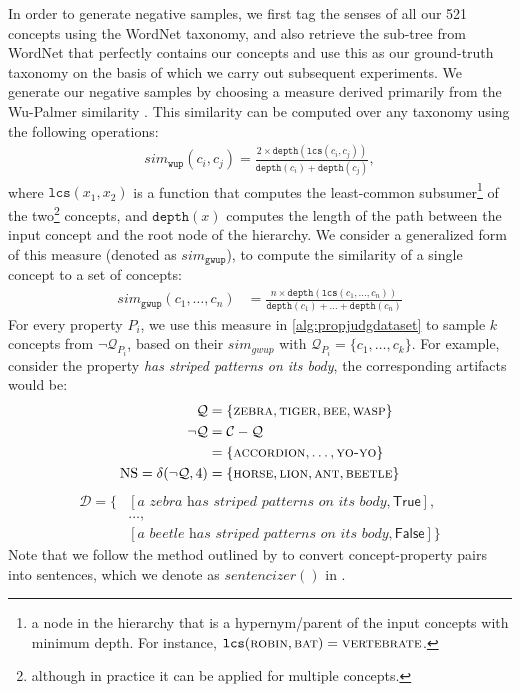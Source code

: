 \documentclass[11pt]{article}    %
\newcommand{\todo}[1]{\textcolor{MidnightBlue}{$_{todo}$[#1]}}
\newcommand{\concepts}{\mathcal{C}}
\newcommand{\true}{\mathsf{True}}
\newcommand{\false}{\mathsf{False}}
\newcommand{\positives}{\mathcal{Q}}
\newcommand{\leftovers}{\neg\positives}
\newcommand{\negsamp}{\delta}
\newcommand{\depth}{\texttt{depth}}
\newcommand{\lcs}{\texttt{lcs}}
\begin{document}
In order to generate negative samples, we first tag the senses of all our 521 concepts using the WordNet \citep{miller1995wordnet} taxonomy, and also retrieve the sub-tree from WordNet that perfectly contains our concepts and use this as our ground-truth taxonomy on the basis of which we carry out subsequent experiments.
We generate our negative samples by choosing a measure derived primarily from the Wu-Palmer similarity \citep{wu-palmer-1994-verb}.
This similarity can be computed over any taxonomy using the following operations:
\begin{align}
    sim_{\texttt{wup}}(c_i, c_j) = \frac{2 \times \depth(\lcs(c_i, c_j))}{\depth(c_i) + \depth(c_j)},
\end{align}
where $\lcs(x_1, x_2)$ is a function that computes the least-common subsumer\footnote{a node in the hierarchy that is a hypernym/parent of the input concepts with minimum depth. For instance, $\lcs(\textsc{robin}, \textsc{bat}) = \textsc{vertebrate}$.} of the two\footnote{although in practice it can be applied for multiple concepts.} concepts, and $\depth(x)$ computes the length of the path between the input concept and the root node of the hierarchy. 
We consider a generalized form of this measure (denoted as $sim_{\texttt{gwup}}$), to compute the similarity of a single concept to a set of concepts:
\begin{align}
    sim_{\texttt{gwup}}(c_1, \dots, c_n) &= \frac{n \times \depth(\lcs(c_1, \dots, c_n))}{\depth(c_1) + \dots + \depth(c_n)}
\end{align}
For every property $P_i$, we use this measure in \cref{alg:propjudgdataset} to sample $k$ concepts from $\leftovers_{P_i}$, based on their $sim_{gwup}$ with $\positives_{P_i} = \{c_1, \dots, c_k\}$.
For example, consider the property \textit{has striped patterns on its body}, the corresponding artifacts would be:
\begin{align*}
    \positives &= \{\textsc{zebra}, \textsc{tiger}, \textsc{bee}, \textsc{wasp}\}\\
    \leftovers &= \concepts - \positives\\
    &= \{\textsc{accordion}, \dots, \textsc{yo-yo}\}\\
    \mathrm{NS} = \negsamp(\leftovers, 4) &= \{\textsc{horse}, \textsc{lion}, \textsc{ant}, \textsc{beetle}\}
\end{align*}
\begin{align*}
    \mathcal{D} = \{&[\textit{a zebra has striped patterns on its body}, \true],\\&\dots, \\
    &[\textit{a beetle has striped patterns on its body}, \false]\}
\end{align*}
Note that we follow the method outlined by \citet{bhatia2020transformer} to convert concept-property pairs into sentences, which we denote as $\textit{sentencizer}()$ in .
\end{document}

